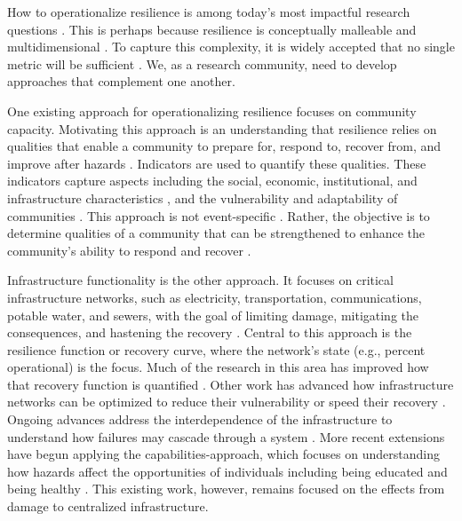 \documentclass[onecolumn,doublespacing]{risa}
\let \cite \parencite
\begin{document}
How to operationalize resilience is among today's most impactful research questions \cite{Caldarice2019-tv}.
This is perhaps because resilience is conceptually malleable and multidimensional \cite{Caldarice2019-tv, Meerow2016-definingRes}. 
To capture this complexity, it is widely accepted that no single metric will be sufficient \cite{Bruneau2003-px, Sharma2018-rs, Haimes2009-gj, Levine2014-je, Cutter2014-jm, Cutter2016-landscape}.
We, as a research community, need to develop approaches that complement one another.

One existing approach for operationalizing resilience focuses on community capacity. 
Motivating this approach is an understanding that resilience relies on qualities that enable a community to prepare for, respond to, recover from, and improve after hazards \cite{Cutter2014-jm, Zautra2008-rb}.
Indicators are used to quantify these qualities.
These indicators capture aspects including the social, economic, institutional, and infrastructure characteristics \cite{Cutter2014-jm, Cutter2010-vg, Cutter2016-landscape, Sherrieb2010-nk}, and the vulnerability and adaptability of communities \cite{Lam2016-qn}.
This approach is not event-specific \cite{Koliou2018-jt}.
Rather, the objective is to determine qualities of a community that can be strengthened to enhance the community's ability to respond and recover \cite{Cutter2014-jm, Cutter2010-vg, Sherrieb2010-nk}. 

Infrastructure functionality is the other approach.
It focuses on critical infrastructure networks, such as electricity, transportation, communications, potable water, and sewers, with the goal of limiting damage, mitigating the consequences, and hastening the recovery \cite{Bruneau2003-px, Barker2013-od, Hosseini2016-pm, Haimes2009-gj, Guidotti2016-vu, Curt2018-kl}.
Central to this approach is the resilience function or recovery curve, where the network's state (e.g., percent operational) is the focus.
Much of the research in this area has improved how that recovery function is quantified \cite{Bruneau2003-px, Chang2004-et, Cimellaro2010-ov, Vugrin2010-vy, Ayyub2014-mf, Sharma2018-rs}.
Other work has advanced how infrastructure networks can be optimized to reduce their vulnerability or speed their recovery \cite{Hosseini2016-pm, Xu2007-sc}.
Ongoing advances address the interdependence of the infrastructure to understand how failures may cascade through a system \cite{Guidotti2016-vu, Gardoni2018-xu}.
More recent extensions \cite{Gardoni2018-xu, Clark2018-pr, Guidotti2019-fc} have begun applying the capabilities-approach, which focuses on understanding how hazards affect the opportunities of individuals including being educated and being healthy \cite{Murphy2006-io}. 
This existing work, however, remains focused on the effects from damage to centralized infrastructure.
\end{document}

